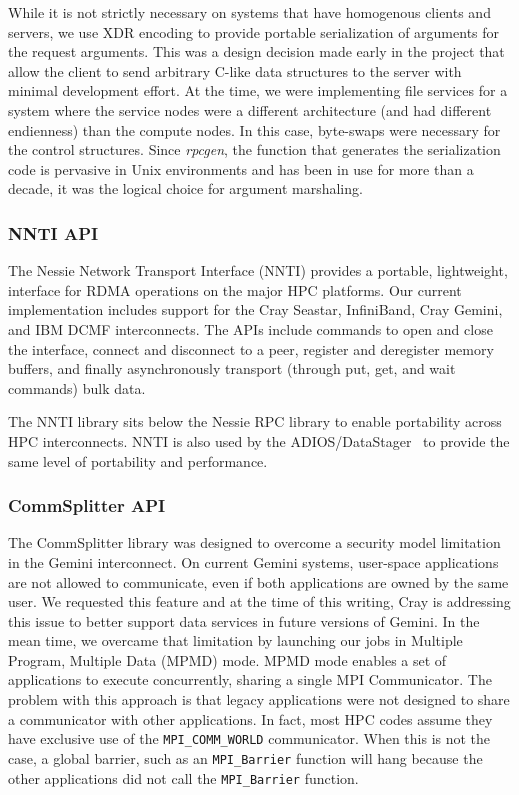 While it is not strictly necessary on systems that have homogenous clients and servers, we 
use XDR encoding to provide portable serialization of arguments for the request arguments. 
This was a design decision made early in the project that allow the client to
send arbitrary C-like data structures to the server with minimal development effort.  At 
the time, we were implementing file services for a system where the service nodes were
a different architecture (and had different endienness) than the compute nodes.  In this 
case, byte-swaps were necessary for the control structures.  Since
\emph{rpcgen}, the function that generates the serialization code is pervasive in Unix
environments and has been in use for more than a decade, it was the logical choice for 
argument marshaling.  

\subsubsection{NNTI API}

The Nessie Network Transport Interface (NNTI) provides a portable, lightweight,
interface for RDMA operations on the major HPC platforms.  Our current
implementation includes support for the Cray Seastar, InfiniBand,
Cray Gemini, and IBM DCMF interconnects.  The APIs include commands
to open and close the interface, connect and disconnect to a peer,
register and deregister memory buffers, and finally asynchronously transport
(through put, get, and wait commands) bulk data. 

The NNTI library sits below the Nessie RPC library to enable portability across
HPC interconnects.  NNTI is also used by the
ADIOS/DataStager~\cite{abbasi:2010:datastager} to provide the same level of
portability and performance.

\subsubsection{CommSplitter API}

The CommSplitter library was designed to overcome a security model limitation in
the Gemini interconnect.  On current Gemini systems, user-space applications
are not allowed to communicate, even if both applications are owned by the same
user.  We requested this feature and at the time of this writing, Cray is
addressing this issue to better support data services in future versions of
Gemini.  In the mean time, we overcame that limitation by launching our jobs in
Multiple Program, Multiple Data (MPMD) mode.  MPMD mode enables a set of
applications to execute concurrently, sharing a single MPI Communicator.   The
problem with this approach is that legacy applications were not designed to
share a communicator with other applications.  In fact, most HPC codes assume
they have exclusive use of the \texttt{MPI\_COMM\_WORLD} communicator.  When
this is not the case, a global barrier, such as an \texttt{MPI\_Barrier}
function will hang because the other applications did not call the
\texttt{MPI\_Barrier} function. 

